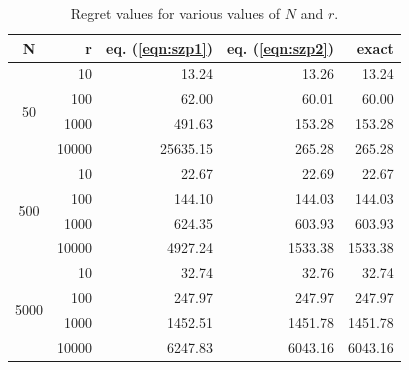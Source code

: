 \begin{table}
\caption{Regret values for various values of $N$ and $r$.}
\label{tbl:regrets}
\begin{center}
\begin{tabular}{crrrr}
N & r & eq. (\ref{eqn:szp1}) & eq. (\ref{eqn:szp2}) & exact \\
\midrule
\multirow{4}{*}{50} & 10 & 13.24 & 13.26 & 13.24 \\
& 100 & 62.00 & 60.01 & 60.00 \\
& 1000 & 491.63 & 153.28 & 153.28 \\
& 10000 & 25635.15 & 265.28 & 265.28 \\
\midrule
\multirow{4}{*}{500} & 10 & 22.67 & 22.69 & 22.67 \\
& 100 & 144.10 & 144.03 & 144.03 \\
& 1000 & 624.35 & 603.93 & 603.93 \\
& 10000 & 4927.24 & 1533.38 & 1533.38 \\
\midrule
\multirow{4}{*}{5000} & 10 & 32.74 & 32.76 & 32.74 \\
& 100 & 247.97 & 247.97 & 247.97 \\
& 1000 & 1452.51 & 1451.78 & 1451.78 \\
& 10000 & 6247.83 & 6043.16 & 6043.16 \\
\bottomrule
\end{tabular}
\end{center}
\end{table}
